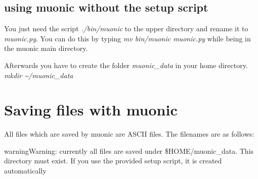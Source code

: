 \documentclass[letterpaper,10pt,english]{sphinxmanual}
\begin{document}
\subsection{using muonic without the setup script}
\label{tutorial:using-muonic-without-the-setup-script}
You just need the script \emph{./bin/muonic} to the upper directory and rename it to \emph{muonic.py}.
You can do this by typing
\emph{mv bin/muonic muonic.py}
while being in the muonic main directory.

Afterwards you have to create the folder \emph{muonic\_data} in your home directory.
\emph{mkdir \textasciitilde{}/muonic\_data}


\section{Saving files with muonic}
\label{tutorial:saving-files-with-muonic}
All files which are saved by muonic are ASCII files. The filenames are as follows:

\begin{notice}{warning}{Warning:}
currently all files are saved under \$HOME/muonic\_data. This directory must exist. If you use the provided setup script, it is created automatically
\end{notice}
\end{document}
